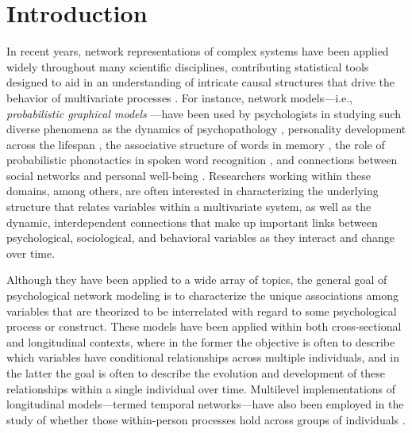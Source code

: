 \chapter{Introduction}
In recent years, network representations of complex systems have been applied widely throughout many scientific disciplines, contributing statistical tools designed to aid in an understanding of intricate causal structures that drive the behavior of multivariate processes \cite{borgatti2009network,barabasi2016network}. For instance, network models---i.e., \textit{probabilistic graphical models} \cite{lauritzen1996graphical}---have been used by psychologists in studying such diverse phenomena as the dynamics of psychopathology \cite{cramer2010comorbidity,epskamp2018personalized}, personality development across the lifespan \cite{read2010neural,costantini2019stability}, the associative structure of words in memory \cite{hills2010associative,de2008word}, the role of probabilistic phonotactics in spoken word recognition \cite{vitevitch2016phonological}, and connections between social networks and personal well-being \cite{kindermann1980relation,galaskiewicz1993social}. Researchers working within these domains, among others, are often interested in characterizing the underlying structure that relates variables within a multivariate system, as well as the dynamic, interdependent connections that make up important links between psychological, sociological, and behavioral variables as they interact and change over time.

Although they have been applied to a wide array of topics, the general goal of psychological network modeling is to characterize the unique associations among variables that are theorized to be interrelated with regard to some psychological process or construct. These models have been applied within both cross-sectional and longitudinal contexts, where in the former the objective is often to describe which variables have conditional relationships across multiple individuals, and in the latter the goal is often to describe the evolution and development of these relationships within a single individual over time. Multilevel implementations of longitudinal models---termed temporal networks---have also been employed in the study of whether those within-person processes hold across groups of individuals \cite{epskamp2018gaussian,epskamp2018personalized}.


